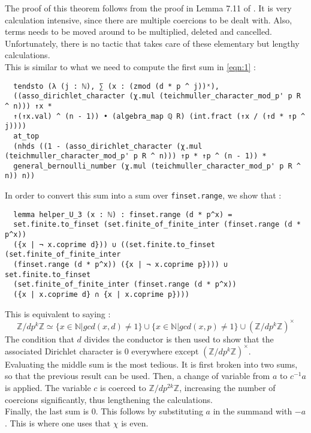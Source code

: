 \documentclass[a4paper,UKenglish,cleveref, autoref, thm-restate]{lipics-v2021}
\newcommand{\lean}[1]{\texttt{#1}\xspace} %
\begin{document}
The proof of this theorem follows from the proof in Lemma 7.11 of \cite{cyc}. It is very calculation intensive, since there are multiple 
coercions to be dealt with. Also, terms needs to be moved around to be multiplied, deleted and cancelled. Unfortunately, there is no tactic 
that takes care of these elementary but lengthy calculations. \\

This is similar to what we need to compute the first sum in \eqref{eqn:1} :
\begin{lstlisting}
  tendsto (λ (j : ℕ), ∑ (x : (zmod (d * p ^ j))ˣ),
  ((asso_dirichlet_character (χ.mul (teichmuller_character_mod_p' p R ^ n))) ↑x *
  ↑(↑x.val) ^ (n - 1)) • (algebra_map ℚ R) (int.fract (↑x / (↑d * ↑p ^ j))))
  at_top
  (nhds ((1 - (asso_dirichlet_character (χ.mul (teichmuller_character_mod_p' p R ^ n))) ↑p * ↑p ^ (n - 1)) *
  general_bernoulli_number (χ.mul (teichmuller_character_mod_p' p R ^ n)) n))
\end{lstlisting}

In order to convert this sum into a sum over \lean{finset.range}, we show that :
\begin{lstlisting}
  lemma helper_U_3 (x : ℕ) : finset.range (d * p^x) = 
  set.finite.to_finset (set.finite_of_finite_inter (finset.range (d * p^x)) 
  ({x | ¬ x.coprime d})) ∪ ((set.finite.to_finset (set.finite_of_finite_inter 
  (finset.range (d * p^x)) ({x | ¬ x.coprime p}))) ∪ set.finite.to_finset 
  (set.finite_of_finite_inter (finset.range (d * p^x)) 
  ({x | x.coprime d} ∩ {x | x.coprime p}))) 
\end{lstlisting}

This is equivalent to saying :
$$ \mathbb{Z} / d p^k \mathbb{Z} \simeq \{ x \in \mathbb{N} | gcd (x, d) \ne 1 \} \cup \{ x \in \mathbb{N} | gcd (x, p) \ne 1 \} 
\cup (\mathbb{Z} / d p^k \mathbb{Z})^{\times} $$
The condition that $d$ divides the conductor is then used to show that the associated Dirichlet character is 0 everywhere except 
$(\mathbb{Z} / d p^k \mathbb{Z})^{\times}$. \\

Evaluating the middle sum is the most tedious. It is first broken into two sums, so that the previous result can be used. Then, a 
change of variable from $a$ to $c^{-1} a$ is applied. The variable $c$ is coerced to $\mathbb{Z}/ d p^{2k} \mathbb{Z}$, increasing 
the number of coercions significantly, thus lengthening the calculations. \\

Finally, the last sum is 0. This follows by substituting $a$ in the summand with $-a$. This is where one uses that $\chi$ is even. \\
\end{document}

